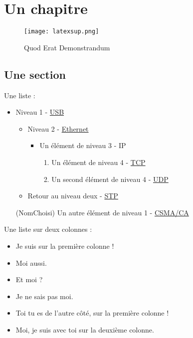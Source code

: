\chapter{Un chapitre}

\begin{figure}[H]
    \centering
    \texttt{[image: latexsup.png]}
    \caption{Quod Erat Demonstrandum}
\end{figure}

\FloatBarrier

\clearpage

\section{Une section}

Une liste :
\begin{itemize} %
    \item Niveau 1 - \href{https://fr.wikipedia.org/wiki/USB}{USB}
    \begin{itemize}
        \item Niveau 2 - \href{https://fr.wikipedia.org/wiki/Ethernet}{Ethernet}
        \begin{itemize}
            \item Un élément de niveau 3 - IP
            \begin{enumerate} %
                \item Un élément de niveau 4 - \href{https://en.wikipedia.org/wiki/TCP}{TCP}
                \item Un second élément de niveau 4 - \href{https://en.wikipedia.org/wiki/UDP}{UDP}
            \end{enumerate}
        \end{itemize}
        \item Retour au niveau deux - \href{https://fr.wikipedia.org/wiki/Spanning_Tree_Protocol}{STP}
    \end{itemize}
    \item[(NomChoisi)] Un autre élément de niveau 1 - \href{https://fr.wikipedia.org/wiki/Carrier_Sense_Multiple_Access_with_Collision_Avoidance}{CSMA/CA}
\end{itemize}

Une liste sur deux colonnes :
\begin{itemize}[twocol]
    \item Je suis sur la première colonne !
    \item Moi aussi.
    \item Et moi ?
    \item Je ne sais pas moi.
    \item Toi tu es de l'autre côté, sur la première colonne !
    \item Moi, je suis avec toi sur la deuxième colonne.
\end{itemize}


